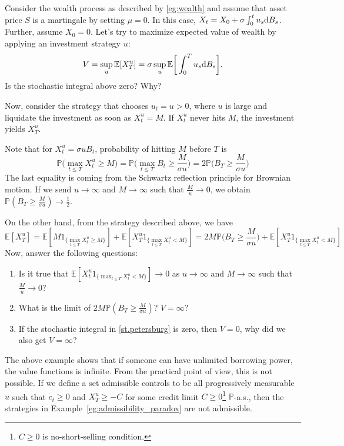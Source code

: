 \documentclass[11pt]{book}
\newcommand{\dd}{\text{\normalfont d}}
\begin{document}
\begin{ex}\label{eg:admissibility_paradox}
	Consider the wealth process as described by \eqref{eg:wealth} and assume that asset price $S$ is a martingale by setting $\mu=0$.
 In this case, $X_t=X_0+\sigma\int_0^tu_s{\dd}B_s$. Further, assume $X_0=0$.
 Let's try to maximize expected value of wealth by applying an investment strategy $u$:
 \begin{equation}\label{st.petersburg}
     V = \sup_{u}\mathbb{E}[X_T^u]=\sigma\sup_{u}\mathbb{E}\bigg[\int_0^T u_s{\dd}B_s\bigg].
 \end{equation}
 Is the stochastic integral above zero? Why?

 Now, consider the strategy that chooses $u_t=u>0$, where $u$ is large and liquidate the investment as soon as $X_t^u=M$. If $X_t^u$ never hits $M$, the investment yields $X_T^u$.
 
Note that for $X^u_t=\sigma u B_t$, probability of hitting $M$ before $T$ is
\begin{equation}
    \mathbb{P}\big(\max_{t\le T} X_t^u\ge M\big) =  \mathbb{P}\bigg(\max_{t\le T} B_t\ge \frac{M}{\sigma u}\bigg) =  2\mathbb{P}\bigg(B_T\ge \frac{M}{\sigma u}\bigg)
\end{equation}
The last equality is coming from the Schwartz reflection principle for Brownian motion. If we send $u\to\infty$ and $M\to\infty$  such that $\frac{M}{u}\to0$, we obtain $\mathbb{P}(B_T\ge \frac{M}{\sigma u})\to \frac12$. 

On the other hand, from the strategy described above, we have 
\begin{equation}
    \mathbb{E}[X_T^u] = \mathbb{E}[M1_{\{\max_{t\le T} X_t^u\ge M\}}]+  \mathbb{E}[X_T^u1_{\{\max_{t\le T} X_t^u< M\}}]= 2M\mathbb{P}\bigg(B_T\ge \frac{M}{\sigma u}\bigg)+\mathbb{E}[X_T^u1_{\{\max_{t\le T} X_t^u< M\}}]
\end{equation}
Now, answer the following questions:
\begin{enumerate}
    \item Is it true that $\mathbb{E}[X_t^u1_{\{\max_{t\le T} X_t^u< M\}}]\to 0 $ as $u\to\infty$ and $M\to\infty$  such that $\frac{M}{u}\to0$?
    \item What is the limit of $2M\mathbb{P}(B_T\ge \frac{M}{\sigma u})$? $V=\infty$?
    \item If the stochastic integral in \eqref{st.petersburg} is zero, then $V=0$, why did we also get $V=\infty$?
\end{enumerate}





\end{ex}
The above example shows that if someone can have unlimited borrowing power, the value functions is infinite. From the practical point of view, this is not possible. If we define a set admissible controls to be all progressively measurable $u$ such that $c_t\ge0$ and $X_T^u\ge -C$  for some credit limit $C\ge0$\footnote{$C\ge0$ is no-short-selling condition.} $\mathbb{P}$-a.s., then the  strategies in Example~\ref{eg:admissibility_paradox} are not admissible.  
\end{document}
